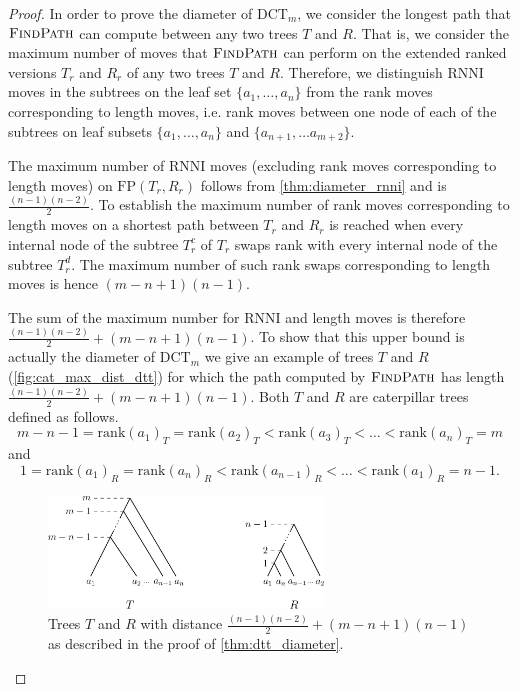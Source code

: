 \documentclass[11pt]{amsart}
\newcommand{\rnni}{\mathrm{RNNI}}
\newcommand{\findpath}{\textsc{FindPath}}
\newcommand{\rank}{\mathrm{rank}}
\newcommand{\fp}{\mathrm{FP}}
\newcommand{\dtt}{\mathrm{DCT}}
\begin{document}
\begin{proof}
	In order to prove the diameter of $\dtt_m$, we consider the longest path that $\findpath$ can compute between any two trees $T$ and $R$.
	That is, we consider the maximum number of moves that $\findpath$ can perform on the extended ranked versions $T_r$ and $R_r$ of any two trees $T$ and $R$.
	Therefore, we distinguish $\rnni$ moves in the subtrees on the leaf set $\{a_1, \ldots, a_n\}$ from the rank moves corresponding to length moves, i.e. rank moves between one node of each of the subtrees on leaf subsets $\{a_1, \ldots, a_n\}$ and $\{a_{n+1}, \ldots a_{m+2}\}$.

	The maximum number of $\rnni$ moves (excluding rank moves corresponding to length moves) on $\fp(T_r,R_r)$ follows from \autoref{thm:diameter_rnni} and is $\frac{(n-1)(n-2)}{2}$.
	To establish the maximum number of rank moves corresponding to length moves on a shortest path between $T_r$ and $R_r$ is reached when every internal node of the subtree $T_r^c$ of $T_r$ swaps rank with every internal node of the subtree $T_r^d$.
	The maximum number of such rank swaps corresponding to length moves is hence $(m-n+1)(n-1)$.

	The sum of the maximum number for $\rnni$ and length moves is therefore $\frac{(n-1)(n-2)}{2} + (m-n+1)(n-1)$.
	To show that this upper bound is actually the diameter of $\dtt_m$ we give an example of trees $T$ and $R$ (\autoref{fig:cat_max_dist_dtt}) for which the path computed by $\findpath$ has length $\frac{(n-1)(n-2)}{2} + (m-n+1)(n-1)$.
	Both $T$ and $R$ are caterpillar trees defined as follows.
	\[m-n-1 = \rank(a_1)_T = \rank(a_2)_T < \rank(a_3)_T < \ldots < \rank(a_n)_T = m\]
	and
	\[1 = \rank(a_1)_R = \rank(a_n)_R < \rank(a_{n-1})_R < \ldots < \rank(a_1)_R = n-1.\]
	\begin{figure}[ht]
		\includegraphics[width=0.65\textwidth]{cat_max_dist_dtt.eps}
		\caption{Trees $T$ and $R$ with distance $\frac{(n-1)(n-2)}{2} + (m-n+1)(n-1)$ as described in the proof of \autoref{thm:dtt_diameter}.}
		\label{fig:cat_max_dist_dtt}
	\end{figure}
\end{proof}
\end{document}
